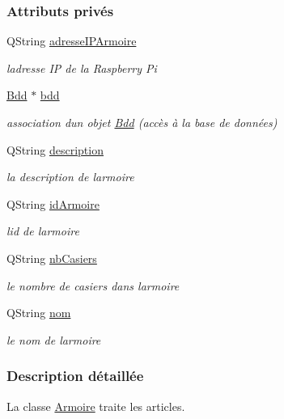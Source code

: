 \subsubsection*{Attributs privés}
\begin{DoxyCompactItemize}
\item 
Q\+String \hyperlink{class_armoire_ab96bd042aa78eaefba0aefb860684ca6}{adresse\+I\+P\+Armoire}
\begin{DoxyCompactList}\small\item\em l\textquotesingle{}adresse IP de la Raspberry Pi \end{DoxyCompactList}\item 
\hyperlink{class_bdd}{Bdd} $\ast$ \hyperlink{class_armoire_a555f656018e7b600987128cdc792e320}{bdd}
\begin{DoxyCompactList}\small\item\em association d\textquotesingle{}un objet \hyperlink{class_bdd}{Bdd} (accès à la base de données) \end{DoxyCompactList}\item 
Q\+String \hyperlink{class_armoire_aa18be328693d7602439c779e30156c02}{description}
\begin{DoxyCompactList}\small\item\em la description de l\textquotesingle{}armoire \end{DoxyCompactList}\item 
Q\+String \hyperlink{class_armoire_a131caceb7d4b90cb7761851757e80f57}{id\+Armoire}
\begin{DoxyCompactList}\small\item\em l\textquotesingle{}id de l\textquotesingle{}armoire \end{DoxyCompactList}\item 
Q\+String \hyperlink{class_armoire_a9c4e926b7cddb13d097b75b3f5ef3de8}{nb\+Casiers}
\begin{DoxyCompactList}\small\item\em le nombre de casiers dans l\textquotesingle{}armoire \end{DoxyCompactList}\item 
Q\+String \hyperlink{class_armoire_a1de028da0fa3f085e2feaad8311d8795}{nom}
\begin{DoxyCompactList}\small\item\em le nom de l\textquotesingle{}armoire \end{DoxyCompactList}\end{DoxyCompactItemize}


\subsubsection{Description détaillée}
La classe \hyperlink{class_armoire}{Armoire} traite les articles. 

